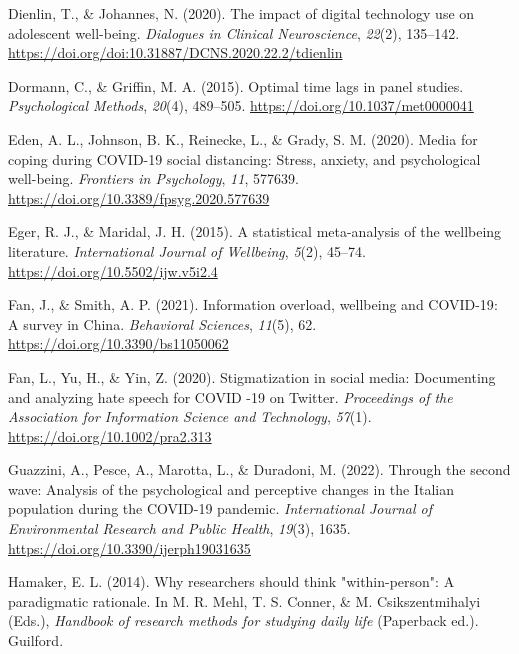 \documentclass[
  man,mask,floatsintext]{apa7}
\newlength{\cslhangindent}
\newlength{\cslentryspacingunit} %
\newenvironment{CSLReferences}[2] %
 {%
  \setlength{\parindent}{0pt}
  \ifodd #1
  \let\oldpar\par
  \def\par{\hangindent=\cslhangindent\oldpar}
  \fi
  \setlength{\parskip}{#2\cslentryspacingunit}
 }%
 {}
\begin{document}
\begin{CSLReferences}{1}{0}
\leavevmode{}%
Dienlin, T., \& Johannes, N. (2020). The impact of digital technology use on adolescent well-being. \emph{Dialogues in Clinical Neuroscience}, \emph{22}(2), 135--142. \url{https://doi.org/doi:10.31887/DCNS.2020.22.2/tdienlin}

\leavevmode{}%
Dormann, C., \& Griffin, M. A. (2015). Optimal time lags in panel studies. \emph{Psychological Methods}, \emph{20}(4), 489--505. \url{https://doi.org/10.1037/met0000041}

\leavevmode{}%
Eden, A. L., Johnson, B. K., Reinecke, L., \& Grady, S. M. (2020). Media for coping during {COVID-19} social distancing: {Stress}, anxiety, and psychological well-being. \emph{Frontiers in Psychology}, \emph{11}, 577639. \url{https://doi.org/10.3389/fpsyg.2020.577639}

\leavevmode{}%
Eger, R. J., \& Maridal, J. H. (2015). A statistical meta-analysis of the wellbeing literature. \emph{International Journal of Wellbeing}, \emph{5}(2), 45--74. \url{https://doi.org/10.5502/ijw.v5i2.4}

\leavevmode{}%
Fan, J., \& Smith, A. P. (2021). Information overload, wellbeing and {COVID-19}: {A} survey in {China}. \emph{Behavioral Sciences}, \emph{11}(5), 62. \url{https://doi.org/10.3390/bs11050062}

\leavevmode{}%
Fan, L., Yu, H., \& Yin, Z. (2020). Stigmatization in social media: {Documenting} and analyzing hate speech for {\textsc{COVID}} -19 on {Twitter}. \emph{Proceedings of the Association for Information Science and Technology}, \emph{57}(1). \url{https://doi.org/10.1002/pra2.313}

\leavevmode{}%
Guazzini, A., Pesce, A., Marotta, L., \& Duradoni, M. (2022). Through the second wave: {Analysis} of the psychological and perceptive changes in the {Italian} population during the {COVID-19} pandemic. \emph{International Journal of Environmental Research and Public Health}, \emph{19}(3), 1635. \url{https://doi.org/10.3390/ijerph19031635}

\leavevmode{}%
Hamaker, E. L. (2014). Why researchers should think "within-person": {A} paradigmatic rationale. In M. R. Mehl, T. S. Conner, \& M. Csikszentmihalyi (Eds.), \emph{Handbook of research methods for studying daily life} (Paperback ed.). {Guilford}.


\end{CSLReferences}
\end{document}

